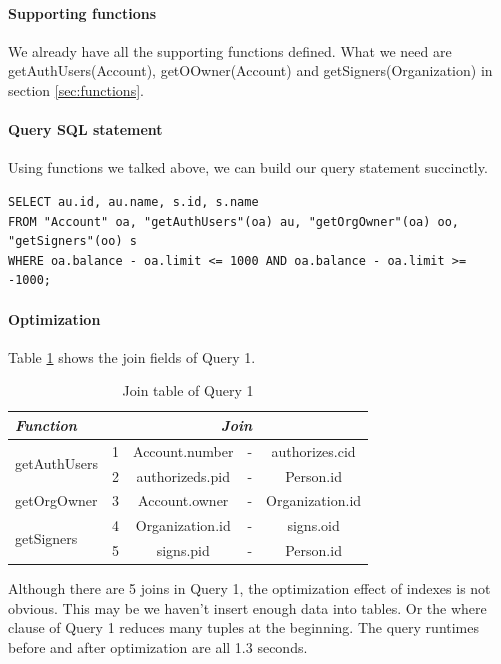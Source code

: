 \documentclass[11pt]{article}
\begin{document}
\paragraph{Supporting functions} We already have all the supporting functions defined. What we need are getAuthUsers(Account), getOOwner(Account) and getSigners(Organization) in section \ref{sec:functions}.

\paragraph{Query SQL statement} Using functions we talked above, we can build our query statement succinctly.
\begin{verbatim}
SELECT au.id, au.name, s.id, s.name
FROM "Account" oa, "getAuthUsers"(oa) au, "getOrgOwner"(oa) oo, "getSigners"(oo) s
WHERE oa.balance - oa.limit <= 1000 AND oa.balance - oa.limit >= -1000;
\end{verbatim}

\paragraph{Optimization} Table \ref{tab:q1} shows the join fields of Query 1.

\begin{table}[!htbp]
\centering
\label{tab:q1}
\caption{Join table of Query 1}
\begin{tabular}{|l||r|c|l|c|}
\hline
{\itshape Function} & \multicolumn{4}{c|}{\itshape Join} \\
\hline
\multirow{2}{*}{getAuthUsers} & 1 & Account.number & - & authorizes.cid \\
\cline{2-5}
& 2 & authorizeds.pid & - & Person.id \\
\hline
getOrgOwner & 3 & Account.owner & - & Organization.id \\
\hline
\multirow{2}{*}{getSigners} & 4 & Organization.id & - & signs.oid \\
\cline{2-5}
& 5 & signs.pid & - & Person.id \\
\hline
\end{tabular}
\end{table}

\par
Although there are 5 joins in Query 1, the optimization effect of indexes is not obvious. This may be we haven't insert enough data into tables. Or the where clause of Query 1 reduces many tuples at the beginning. The query runtimes before and after optimization are all 1.3 seconds.
\end{document}
